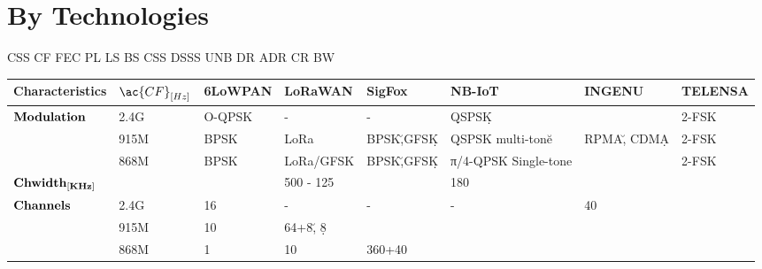\onecolumn
\section{By Technologies}
\setlength{\hoffset}{-.5in}

\ac{CSS} \ac{CF} \ac{FEC}  \ac{PL} \ac{LS} \ac{BS} \ac{CSS} \ac{DSSS} \ac{UNB} \ac{DR} \ac{ADR} \ac{CR} \ac{BW}





\begin{longtable}{l|l|l|l|l|l|l|l}
	\bf{Characteristics}                 & $\ac{CF}_{[Hz]}$ & \bf{6LoWPAN} & \bf{LoRaWAN}           & \bf{SigFox}   & \bf{NB-IoT}                            & \textbf{INGENU}   & \textbf{TELENSA}\\\hline
	\multirow{3}{*}{$\bf{Modulation}$}   & 2.4G             & O-QPSK       & -                      & -             & QSPSK\d                                &                   & 2-FSK           \\
	\                                    & 915M             & BPSK         & LoRa                   & BPSK\u,GFSK\d & QSPSK multi-tone\u                     & RPMA\u,	CDMA\d    & 2-FSK           \\
	\                                    & 868M             & BPSK         & LoRa/GFSK              & BPSK\u,GFSK\d & π/4-QPSK Single-tone					 &                   & 2-FSK           \\\hline
	$\bf{Ch width_{[KHz]}}$              &                  &              & 500 - 125              &               & 180                                    &                   & \\
	\multirow{3}{*}{$\bf{Channels}$}     & 2.4G             & 16           & -                      & -             & -                                      & 40                & \ko             \\
	\                                    & 915M             & 10           & 64+8\u, 8\d            & \ko           & \ko                                    & \ko               & \ko             \\
	\                                    & 868M             & 1            & 10                     & 360+40        & \ko                                    & \ko               & \ko             \\\hline

\end{longtable}
